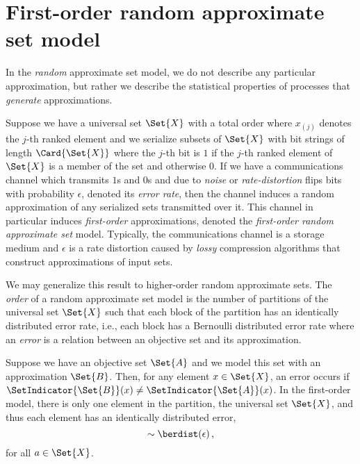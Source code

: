\documentclass[ ../main.tex]{subfiles}
\begin{document}
\section{First-order random approximate set model}
In the \emph{random} approximate set model, we do not describe any particular approximation, but rather we describe the statistical properties of processes that \emph{generate} approximations.

Suppose we have a universal set $\Set{X}$ with a total order where $x_{(j)}$ denotes the $j$-th ranked element
and we serialize subsets of $\Set{X}$ with bit strings of length $\Card{\Set{X}}$ where the $j$-th bit is $1$ if the $j$-th ranked element of $\Set{X}$ is a member of the set and otherwise $0$.
If we have a communications channel which transmits $1$s and $0$s and due to \emph{noise} or \emph{rate-distortion} flips bits with probability $\epsilon$, denoted its \emph{error rate}, then the channel induces a random approximation of any serialized sets transmitted over it.
This channel in particular induces \emph{first-order} approximations, denoted the \emph{first-order random approximate set} model.
Typically, the communications channel is a storage medium and $\epsilon$ is a rate distortion caused by \emph{lossy} compression algorithms that construct approximations of input sets.

We may generalize this result to higher-order random approximate sets.
The \emph{order} of a random approximate set model is the number of partitions of the universal set $\Set{X}$ such that each block of the partition has an identically distributed error rate, i.e., each block has a Bernoulli distributed error rate where an \emph{error} is a relation between an objective set and its approximation.

Suppose we have an objective set $\Set{A}$ and we model this set with an approximation $\Set{B}$.
Then, for any element $x \in \Set{X}$, an error occurs if $\SetIndicator{\Set{B}}(x) \neq \SetIndicator{\Set{A}}(x)$.
In the first-order model, there is only one element in the partition, the universal set $\Set{X}$, and thus each element has an identically distributed error,
\begin{equation}
	[\SetIndicator{\ASetFO{A}}(a) \neq \SetIndicator{\Set{A}}(a)] \sim \berdist(\epsilon)\,,
\end{equation}
for all $a \in \Set{X}$.
\end{document}
